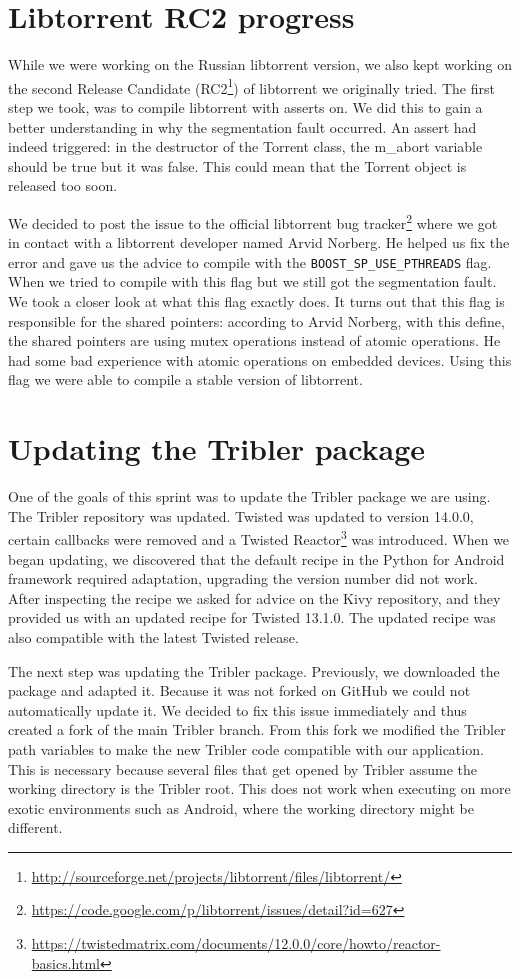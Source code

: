 	\section{Libtorrent RC2 progress}
		While we were working on the Russian libtorrent version, we also kept working on the second Release Candidate (RC2\footnote{\url{http://sourceforge.net/projects/libtorrent/files/libtorrent/}}) of libtorrent we originally tried. The first step we took, was to compile libtorrent with asserts on. We did this to gain a better understanding in why the segmentation fault occurred. An assert had indeed triggered: in the destructor of the Torrent class, the m\_abort variable should be true but it was false. This could mean that the Torrent object is released too soon.
		
		We decided to post the issue to the official libtorrent bug tracker\footnote{\url{https://code.google.com/p/libtorrent/issues/detail?id=627}} where we got in contact with a libtorrent developer named Arvid Norberg. He helped us fix the error and gave us the advice to compile with the \texttt{BOOST\_SP\_USE\_PTHREADS} flag. When we tried to compile with this flag but we still got the segmentation fault. We took a closer look at what this flag exactly does. It turns out that this flag is responsible for the shared pointers: according to Arvid Norberg, with this define, the shared pointers are using mutex operations instead of atomic operations. He had some bad experience with atomic operations on embedded devices. Using this flag we were able to compile a stable version of libtorrent.
				
	\section{Updating the Tribler package}
		One of the goals of this sprint was to update the Tribler package we are using. The Tribler repository was updated. Twisted was updated to version 14.0.0, certain callbacks were removed and a Twisted Reactor\footnote{\url{https://twistedmatrix.com/documents/12.0.0/core/howto/reactor-basics.html}} was introduced.
		When we began updating, we discovered that the default recipe in the Python for Android framework required adaptation, upgrading the version number did not work. After inspecting the recipe we asked for advice on the Kivy repository, and they provided us with an updated recipe for Twisted 13.1.0. The updated recipe was also compatible with the latest Twisted release.
		
		The next step was updating the Tribler package. Previously, we downloaded the package and adapted it. Because it was not forked on GitHub we could not automatically update it. We decided to fix this issue immediately and thus created a fork of the main Tribler branch. From this fork we modified the Tribler path variables to make the new Tribler code compatible with our application. This is necessary because several files that get opened by Tribler assume the working directory is the Tribler root. This does not work when executing on more exotic environments such as Android, where the working directory might be different.
		
